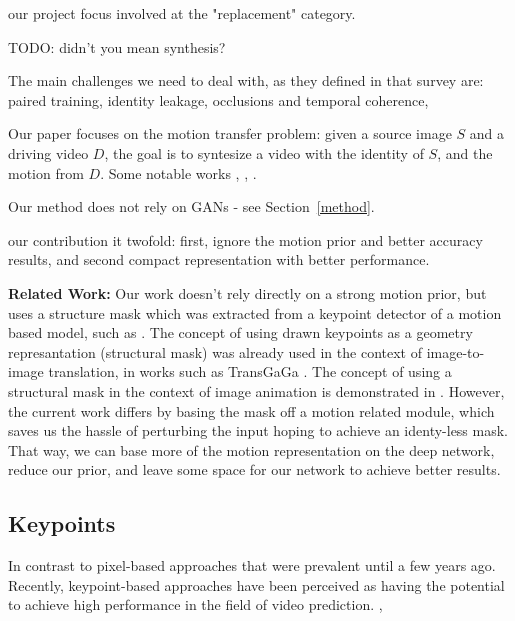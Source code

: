 \documentclass{article}
\begin{document}
our project focus involved at the "replacement" category.

TODO: didn't you mean synthesis?

The main challenges we need to deal with, as they defined in that survey are: paired training, identity leakage, occlusions and temporal coherence,



Our paper focuses on the motion transfer problem: given a source image $S$
and a driving video $D$, the goal is to syntesize a video with the identity
of $S$, and the motion from $D$.
Some notable works \cite{siarohin2020order}, \cite{wiles2018x2face},
\cite{siarohin2019animating}.

Our method does not rely on GANs - see Section~\ref{method}.

our contribution it twofold: first, ignore the motion prior and better accuracy results, and second compact representation with better performance.

\medskip

\textbf{Related Work:} Our work doesn't rely directly on a strong motion prior,
but uses a structure mask which was extracted from a keypoint detector
of a motion based model, such as \cite{siarohin2020order}. The concept of using drawn keypoints as
a geometry represantation (structural mask) was already used in the context
of image-to-image translation, in works such as TransGaGa \cite{wu2019transgaga}.
The concept of using a structural mask in the context of image animation is
demonstrated in \cite{shalev2020image}. However, the current work differs
by basing the mask off a motion related module, which saves us the hassle
of perturbing the input hoping to achieve an identy-less mask. That way, we
can base more of the motion representation on the deep network, reduce our
prior, and leave some space for our network to achieve better results.


\subsection{Keypoints}
In contrast to pixel-based approaches that were prevalent until a few years ago.
Recently, keypoint-based approaches have been perceived as having the
potential to achieve high performance in the field of video prediction.
\cite{kim2019unsupervised}, \cite{balakrishnan2018synthesizing}
\cite{ma2017pose}  \cite{reed2017parallel} \cite{chan2019everybody}
\cite{villegas2017learning}
\cite{cai2018deep}
\cite{wang2018every}
\cite{reed2015deep}
\end{document}

